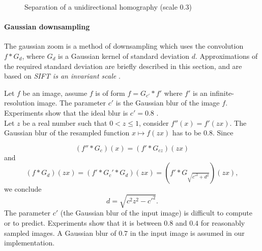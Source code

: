 \begin{figure}[h!]
\caption{Separation of a unidirectional homography (scale $0.3$) }
\label{image_separation_f14}
\end{figure}

\paragraph{Gaussian downsampling}
\label{zoom_gaussien}
The gaussian zoom is a method of downsampling which uses the convolution $f*G_{d}$, where $G_d$ is a Gaussian kernel of standard deviation $d$. Approximations of the required standard deviation are briefly described in this section, and are based on \emph{SIFT is an invariant scale} \cite{morel2011sift}.


Let $f$ be an image, assume $f$ is of form $f=G_{c'} * f'$ where $f'$ is an infinite-resolution image. The parameter $c'$ is the Gaussian blur of the image $f$. Experiments show that the ideal blur is $c'=0.8$ \cite{morel2011sift}.\\
Let $z$ be a real number such that $0<z\le 1$, consider $f''(x)=f'(zx)$.
The Gaussian blur of the resampled function $x\mapsto f(zx)$ has to be $0.8$. Since

\begin{equation*}
(f''*G_{c})(x)=(f'*G_{cz})(zx)
\end{equation*}
and 
\begin{equation*}
(f*G_d)(zx)=(f'*G_c'*G_d)(zx)=(f'*G_{\sqrt{c'^2 + d^2}})(zx),
\end{equation*}
we conclude
\begin{equation}
d=\sqrt{c^2 z^2 - c'^2}.
\label{formule_zoom_gaussien}
\end{equation}
The parameter $c'$ (the Gaussian blur of the input image) is difficult to compute or to predict. Experiments show that it is between $0.8$ and $0.4$ for reasonably sampled images. A Gaussian blur of $0.7$ in the input image is assumed in our implementation.


